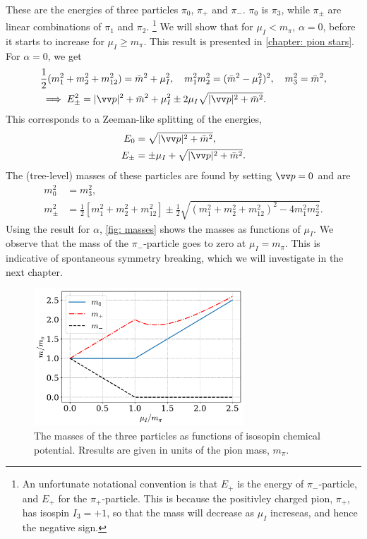 %
These are the energies of three particles $\pi_0$, $\pi_+$ and $\pi_-$.
$\pi_0$ is $\pi_3$, while $\pi_\pm$ are linear combinations of $\pi_1$ and $\pi_2$.
\footnote{An unfortunate notational convention is that $E_+$ is the energy of $\pi_-$-particle, and $E_+$ for the $\pi_+$-particle. This is because the positivley charged pion, $\pi_+$, has isospin $I_3 = +1$, so that the mass will decrease as $\mu_I$ increseas, and hence the negative sign.}
We will show that for $\mu_I < m_\pi$, $\alpha = 0$, before it starts to increase for $\mu_I \geq m_\pi$.
This result is presented in \autoref{chapter: pion stars}.
For $\alpha = 0$, we get
%
\begin{align*}
    &\frac{1}{2}(m_1^2 + m_2^2 + m_{12}^2) 
    =
    \bar m^2 + \mu_I^2, \quad
    m_1^2 m_2^2 = (\bar m^2 - \mu_I^2)^2, \quad
    m_3^2 = \bar m^2, \\
    &\implies E_\pm^2 = |\vv p|^2 + \bar m^2 + \mu_I^2 \pm 2 \mu_I \sqrt{|\vv p|^2 + \bar m^2}.
\end{align*}
%
This corresponds to a Zeeman-like splitting of the energies,
%
\begin{align}
    \label{zeeman energy}
    E_0 & = \sqrt{|\vv p |^2 + \bar m^2}, \\
    \label{zeeman energy 2}
    E_\pm &= \pm \mu_I + \sqrt{|\vv p |^2 + \bar m^2}.
\end{align}
%
The (tree-level) masses of these particles are found by setting $\vv p = 0$ and are
%
\begin{align}
    m_0^2 &= m_3^2, \\
    m_\pm^2
    & =  \frac{1}{2}
    \left[
        m_1^2 + m_2^2 + m_{12}^2 
    \right]
    \pm \frac{1}{2}
    \sqrt{
        \left(
            m_1^2 + m_2^2 + m_{12}^2
        \right)^2
        - 4 m_1^2 m_2^2
    }.
\end{align}
%
Using the result for $\alpha$, \autoref{fig: masses} shows the masses as functions of $\mu_I$.
We observe that the mass of the $\pi_-$-particle goes to zero at $\mu_I = m_\pi$.
This is indicative of spontaneous symmetry breaking, which we will investigate in the next chapter.

\begin{figure}[h]
    \centering
    \includegraphics[width=0.7\textwidth]{../scripts/figurer/leading_order_masses.pdf}
    \caption{The masses of the three particles as functions of isosopin chemical potential. Rresults are given in units of the pion mass, $m_\pi$.}
    \label{fig: masses}
\end{figure}


